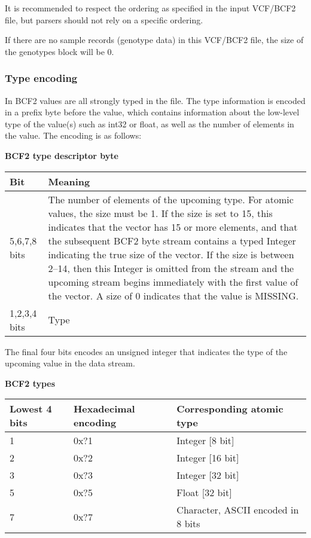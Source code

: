 \documentclass[8pt]{article}
\begin{document}
It is recommended to respect the ordering as specified in the input VCF/BCF2 file, but parsers should not rely on a specific ordering.

If there are no sample records (genotype data) in this VCF/BCF2 file, the size of the genotypes block will be 0.


\subsubsection{Type encoding}
\label{BcfTypeEncoding}

In BCF2 values are all strongly typed in the file.
The type information is encoded in a prefix byte before the value, which contains information about the low-level type of the value(s) such as int32 or float, as well as the number of elements in the value.
The encoding is as follows:

\vspace{0.3cm}
\textbf{BCF2 type descriptor byte}

\vspace{0.3cm}
\begin{tabular}{|p{2cm} | p{10cm}|} \hline
Bit & Meaning \\ \hline
5,6,7,8 bits & The number of elements of the upcoming type. 
For atomic values, the size must be 1. 
If the size is set to 15, this indicates that the vector has 15 or more elements, and that the subsequent BCF2 byte stream contains a typed Integer indicating the true size of the vector. 
If the size is between 2--14, then this Integer is omitted from the stream and the upcoming stream begins immediately with the first value of the vector.
A size of 0 indicates that the value is MISSING. \\ \hline
1,2,3,4 bits & Type \\ \hline
\end{tabular}
\vspace{0.3cm}

The final four bits encodes an unsigned integer that indicates the type of the upcoming value in the data stream.

\textbf{BCF2 types}

\vspace{0.3cm}
\begin{tabular}{|l | l | l|} \hline
Lowest 4 bits & Hexadecimal encoding & Corresponding atomic type \\ \hline
1 & 0x?1 & Integer [8 bit] \\ \hline
2 & 0x?2 & Integer [16 bit] \\ \hline
3 & 0x?3 & Integer [32 bit] \\ \hline
5 & 0x?5 & Float [32 bit] \\ \hline
7 & 0x?7 & Character, ASCII encoded in 8 bits \\ \hline
\end{tabular}
\vspace{0.3cm}
\end{document}
